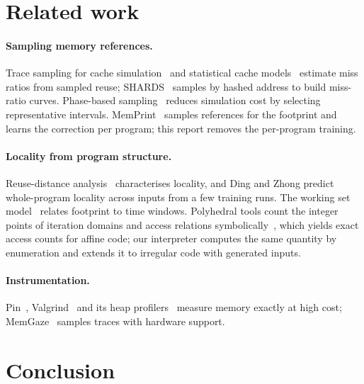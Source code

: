 \documentclass[11pt]{article}
\newcommand{\memprint}{MemPrint}
\begin{document}
\section{Related work}
\label{sec:related}

\paragraph{Sampling memory references.}
Trace sampling for cache simulation~\cite{kessler1994} and statistical cache models~\cite{Berg2013StatCache,
eklov2010statstack} estimate miss ratios from sampled reuse; SHARDS~\cite{waldspurger2015shards} samples by hashed
address to build miss-ratio curves. Phase-based sampling~\cite{sherwood2002simpoint,wunderlich2003smarts} reduces
simulation cost by selecting representative intervals. \memprint{}~\cite{memprint} samples references for the
footprint and learns the correction per program; this report removes the per-program training.

\paragraph{Locality from program structure.}
Reuse-distance analysis~\cite{mattson1970,Beyls2005ReuseDistance,ding2003reuse} characterises locality, and
Ding and Zhong predict whole-program locality across inputs from a few training runs. The working set
model~\cite{denning1968} relates footprint to time windows. Polyhedral tools count the integer points of iteration
domains and access relations symbolically~\cite{grosser2012polly,verdoolaege2007barvinok}, which yields exact
access counts for affine code; our interpreter computes the same quantity by enumeration and extends it to irregular
code with generated inputs.

\paragraph{Instrumentation.}
Pin~\cite{Luk2005Pin}, Valgrind~\cite{Nethercote2007Valgrind} and its heap profilers~\cite{ValgrindMassif,dhat}
measure memory exactly at high cost; MemGaze~\cite{Xu2020MemGaze} samples traces with hardware support.

\section{Conclusion}
\label{sec:conclusion}
\end{document}
